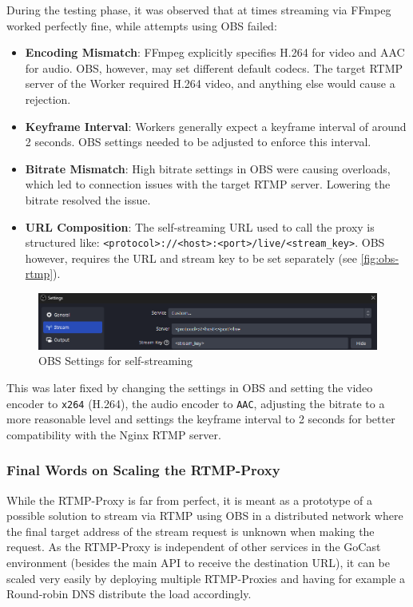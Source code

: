 During the testing phase, it was observed that at times streaming via FFmpeg worked perfectly fine, while attempts using OBS failed:
\begin{itemize}
    \item \textbf{Encoding Mismatch}: FFmpeg explicitly specifies H.264 for video and AAC for audio. OBS, however, may set different default codecs. The target \ac{RTMP} server of the Worker required H.264 video, and anything else would cause a rejection.
    \item \textbf{Keyframe Interval}: Workers generally expect a keyframe interval of around 2 seconds. OBS settings needed to be adjusted to enforce this interval.
    \item \textbf{Bitrate Mismatch}: High bitrate settings in OBS were causing overloads, which led to connection issues with the target \ac{RTMP} server. Lowering the bitrate resolved the issue.
    \item \textbf{URL Composition}: The self-streaming URL used to call the proxy is structured like: \texttt{<protocol>://<host>:<port>/live/<stream\_key>}. OBS however, requires the URL and stream key to be set separately (see \autoref{fig:obs-rtmp}).
\end{itemize}

\begin{figure}[htpb]
    \centering
    \includegraphics[width=\linewidth]{images/OBSRTMP.png}
    \caption[OBS Settings for self-streaming]{OBS Settings for self-streaming}\label{fig:obs-rtmp}
\end{figure}

This was later fixed by changing the settings in OBS and setting the video encoder to \texttt{x264} (H.264), the audio encoder to \texttt{AAC}, adjusting the bitrate to a more reasonable level and settings the keyframe interval to 2 seconds for better compatibility with the Nginx \ac{RTMP} server.

\subsubsection{Final Words on Scaling the RTMP-Proxy}

While the RTMP-Proxy is far from perfect, it is meant as a prototype of a possible solution to stream via \ac{RTMP} using OBS in a distributed network where the final target address of the stream request is unknown when making the request. As the RTMP-Proxy is independent of other services in the GoCast environment (besides the main \ac{API} to receive the destination URL), it can be scaled very easily by deploying multiple RTMP-Proxies and having for example a Round-robin DNS distribute the load accordingly.

